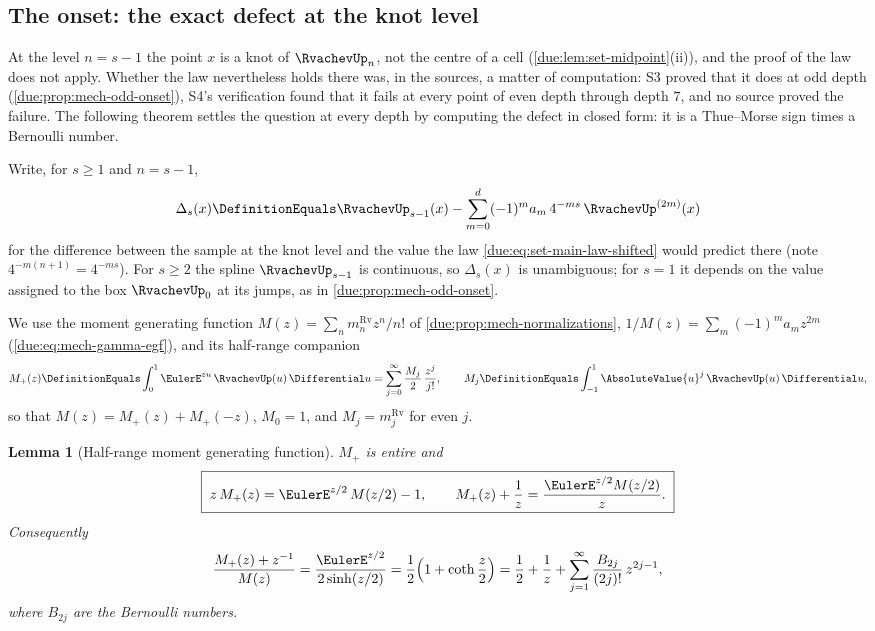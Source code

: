 \documentclass[11pt,oneside]{article}
\theoremstyle{plain}
\newtheorem{lemma}[theorem]{Lemma}
\theoremstyle{definition}
\theoremstyle{remark}
\newcommand{\upn}[1]{\RvachevUp_{#1}}
\newcommand{\am}[1]{a_{#1}}                                 %
\begin{document}
\subsection{The onset: the exact defect at the knot level}
\label{due:sec:sharp-onset}

At the level $n=s-1$ the point $x$ is a knot of $\upn{n}$, not the centre
of a cell (\cref{due:lem:set-midpoint}(ii)), and the proof of the law does
not apply.  Whether the law nevertheless holds there was, in the sources, a
matter of computation: S3 proved that it does at odd depth
(\cref{due:prop:mech-odd-onset}), S4's verification found that it fails
at every point of even depth through depth $7$, and no source proved the
failure.  The following theorem settles the question at every depth by
computing the defect in closed form: it is a Thue--Morse sign times a
Bernoulli number.

Write, for $s\ge1$ and $n=s-1$,
\begin{equation}
 \Delta_{s}(x)\DefinitionEquals
 \upn{s-1}(x)-\sum_{m=0}^{d}(-1)^{m}\am{m}\,4^{-ms}\,\RvachevUp^{(2m)}(x)
 \label{due:eq:sharp-defect-def}
\end{equation}
for the difference between the sample at the knot level and the value the
law \cref{due:eq:set-main-law-shifted} would predict there (note
$4^{-m(n+1)}=4^{-ms}$).  For $s\ge2$ the spline $\upn{s-1}$ is continuous,
so $\Delta_{s}(x)$ is unambiguous; for $s=1$ it depends on the value
assigned to the box $\upn{0}$ at its jumps, as in
\cref{due:prop:mech-odd-onset}.

We use the moment generating function $M(z)=\sum_{n}m^{\mathrm{Rv}}_{n}z^{n}/n!$
of \cref{due:prop:mech-normalizations}, $1/M(z)=\sum_{m}(-1)^{m}\am{m}z^{2m}$
(\cref{due:eq:mech-gamma-egf}), and its half-range companion
\begin{equation}
 M_{+}(z)\DefinitionEquals\int_{0}^{1}\EulerE^{zu}\,\RvachevUp(u)\,\Differential u
 =\sum_{j=0}^{\infty}\frac{M_{j}}{2}\,\frac{z^{j}}{j!},
 \qquad
 M_{j}\DefinitionEquals\int_{-1}^{1}\AbsoluteValue{u}^{j}\,\RvachevUp(u)\,\Differential u,
 \label{due:eq:sharp-half-mgf-def}
\end{equation}
so that $M(z)=M_{+}(z)+M_{+}(-z)$, $M_{0}=1$, and $M_{j}=m^{\mathrm{Rv}}_{j}$
for even $j$.

\begin{lemma}[Half-range moment generating function]
\label{due:lem:sharp-half-mgf}
$M_{+}$ is entire and
\begin{equation}
 \boxed{\;z\,M_{+}(z)=\EulerE^{z/2}\,M(z/2)-1,\qquad
 M_{+}(z)+\frac1z=\frac{\EulerE^{z/2}M(z/2)}{z}.\;}
 \label{due:eq:sharp-half-mgf}
\end{equation}
Consequently
\begin{equation}
 \frac{M_{+}(z)+z^{-1}}{M(z)}
 =\frac{\EulerE^{z/2}}{2\sinh(z/2)}
 =\frac12\Bigl(1+\coth\frac z2\Bigr)
 =\frac12+\frac1z+\sum_{j=1}^{\infty}\frac{B_{2j}}{(2j)!}\,z^{2j-1},
 \label{due:eq:sharp-coth}
\end{equation}
where $B_{2j}$ are the Bernoulli numbers.
\end{lemma}
\end{document}
